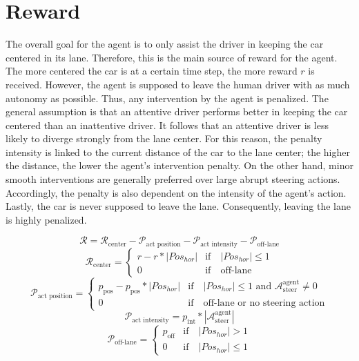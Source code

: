 \section{Reward}

The overall goal for the agent is to only assist the driver in keeping the car centered in its lane. Therefore, this is the main source of reward for the agent. The more centered the car is at a certain time step, the more reward $r$ is received. However, the agent is supposed to leave the human driver with as much autonomy as possible. Thus, any intervention by the agent is penalized. The general assumption is that an attentive driver performs better in keeping the car centered than an inattentive driver. It follows that an attentive driver is less likely to diverge strongly from the lane center. For this reason, the penalty intensity is linked to the current distance of the car to the lane center; the higher the distance, the lower the agent's intervention penalty. On the other hand, minor smooth interventions are generally preferred over large abrupt steering actions. Accordingly, the penalty is also dependent on the intensity of the agent's action. Lastly, the car is never supposed to leave the lane. Consequently, leaving the lane is highly penalized.


\begin{equation}
    \mathcal{R} = \mathcal{R}_{\textrm{center}} - \mathcal{P}_{\textrm{act position}} - \mathcal{P}_{\textrm{act intensity}} - \mathcal{P}_{\textrm{off-lane}}
\end{equation}
\begin{equation}
    \mathcal{R}_{\textrm{center}} = 
    \begin{cases}
        r - r * |Pos_{hor}| & \text{if} \quad |Pos_{hor}| \leq 1 \\
        0 & \text{if} \quad \text{off-lane}
    \end{cases}
\end{equation}
\begin{equation}
    \mathcal{P}_{\textrm{act position}} = 
    \begin{cases}
        p_{\textrm{pos}} - p_{\textrm{pos}} * |Pos_{hor}| & \text{if} \quad |Pos_{hor}| \leq 1 \text{ and } \mathcal{A}_{\textrm{steer}}^{\textrm{agent}} \neq 0 \\
        0 & \text{if} \quad \text{off-lane or no steering action}
    \end{cases}
\end{equation}
\begin{equation}
    \mathcal{P}_{\textrm{act intensity}} = p_{\textrm{int}} * |\mathcal{A}_{\textrm{steer}}^{\textrm{agent}}|
\end{equation}
\begin{equation}
    \mathcal{P}_{\textrm{off-lane}} = 
    \begin{cases}
        p_{\textrm{off}} & \text{if} \quad |Pos_{hor}| > 1 \\
        0 & \text{if} \quad |Pos_{hor}| \leq 1
    \end{cases}
\end{equation}
